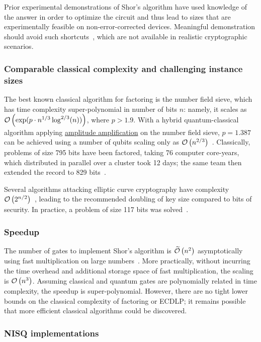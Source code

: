 \begin{refsection}
Prior experimental demonstrations of Shor's algorithm have used knowledge of the answer in order to optimize the circuit and thus lead to sizes that are experimentally feasible on non-error-corrected devices. Meaningful demonstration should avoid such shortcuts~\cite{smolin2013OverQF}, which are not available in realistic cryptographic scenarios.


\subsubsection*{Comparable classical complexity and challenging instance sizes}
The best known classical algorithm for factoring is the number field sieve, which has time complexity super-polynomial in number of bits $n$: namely, it scales as $\mathcal{O}\left( \exp(p\cdot n^{1/3}\log^{2/3}(n)) \right)$, where $p>1.9$. With a hybrid quantum-classical algorithm applying \hyperref[prim:AmpAmp]{amplitude amplification} on the number field sieve, $p= 1.387$ can be achieved using a number of qubits scaling only as $\mathcal{O}\left( n^{2/3} \right)$~\cite{bernstein2017LowResourceFactoring}. Classically, problems of size 795 bits have been factored, taking 76 computer core-years, which distributed in parallel over a cluster took 12 days; the same team then extended the record to 829 bits~\cite{boudot2020Factorization240Digit}.

Several algorithms attacking elliptic curve cryptography have complexity $\mathcal{O}\left( 2^{n/2} \right)$~\cite{washington2003elliptic}, leading to the recommended doubling of key size compared to bits of security. In practice, a problem of size 117 bits was solved~\cite{bernstein2016ECCFPGA}.

\subsubsection*{Speedup}
The number of gates to implement Shor's algorithm is $\widetilde{\mathcal{O}}\left( n^2 \right)$ asymptotically using fast multiplication on large numbers~\cite{beckman1996EfficientNetworksFactoring}. More practically, without incurring the time overhead and additional storage space of fast multiplication, the scaling is $\mathcal{O}\left( n^3 \right)$. Assuming classical and quantum gates are polynomially related in time complexity, the speedup is super-polynomial. However, there are no tight lower bounds on the classical complexity of factoring or ECDLP; it remains possible that more efficient classical algorithms could be discovered.

\subsubsection*{NISQ implementations}


\end{refsection}
